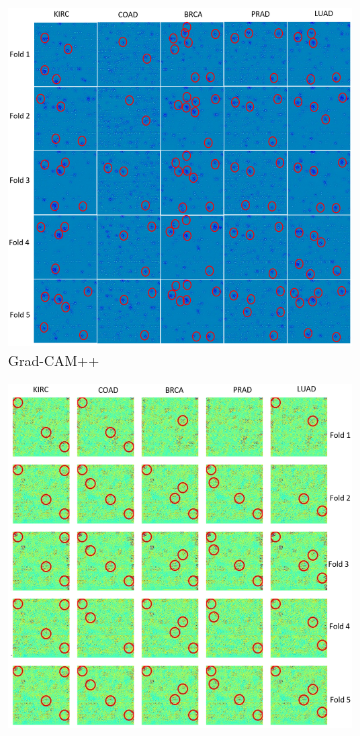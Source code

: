 \begin{figure}
	\centering
	\begin{subfigure}{.48\linewidth}
		\centering
		\includegraphics[scale=0.9]{images/gcam+.png}
		\caption{Grad-CAM++}
        \label{fig:hm_gcam++}
	\end{subfigure}
	\begin{subfigure}{0.48\linewidth}
		\centering
		\includegraphics[scale=0.9]{images/lrp_viz.png}

\end{subfigure}
\end{figure}
